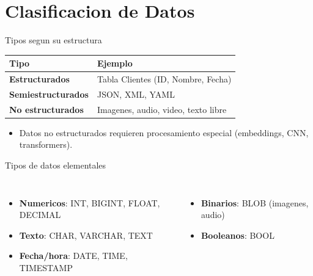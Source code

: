 \documentclass[aspectratio=169, 10pt, xcolor=table]{beamer}
\begin{document}
\section{Clasificacion de Datos}

\begin{frame}{Tipos segun su estructura}
    \begin{table}
        \centering
        \begin{tabular}{l|l}
            \toprule
            Tipo & Ejemplo \\
            \midrule
            \textbf{Estructurados} & Tabla Clientes (ID, Nombre, Fecha) \\
            \textbf{Semiestructurados} & JSON, XML, YAML \\
            \textbf{No estructurados} & Imagenes, audio, video, texto libre \\
            \bottomrule
        \end{tabular}
    \end{table}
    \begin{itemize}
        \item Datos no estructurados requieren procesamiento especial (embeddings, CNN, transformers).
    \end{itemize}
\end{frame}

\begin{frame}{Tipos de datos elementales}
    \begin{columns}[t]
        \begin{itemize}
            \item \textbf{Numericos}: INT, BIGINT, FLOAT, DECIMAL
            \item \textbf{Texto}: CHAR, VARCHAR, TEXT
            \item \textbf{Fecha/hora}: DATE, TIME, TIMESTAMP
        \end{itemize}
        \begin{itemize}
            \item \textbf{Binarios}: BLOB (imagenes, audio)
            \item \textbf{Booleanos}: BOOL
        \end{itemize}
    \end{columns}
\end{frame}
\end{document}
